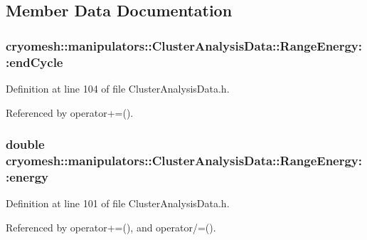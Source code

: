 \subsection{\-Member \-Data \-Documentation}
\hypertarget{structcryomesh_1_1manipulators_1_1ClusterAnalysisData_1_1RangeEnergy_afc1f6d068e8301e327981a578b83f981}{
\subsubsection[{end\-Cycle}]{ {\bf cryomesh\-::manipulators\-::\-Cluster\-Analysis\-Data\-::\-Range\-Energy\-::end\-Cycle}}}\label{structcryomesh_1_1manipulators_1_1ClusterAnalysisData_1_1RangeEnergy_afc1f6d068e8301e327981a578b83f981}


\-Definition at line 104 of file \-Cluster\-Analysis\-Data.\-h.



\-Referenced by operator+=().

\hypertarget{structcryomesh_1_1manipulators_1_1ClusterAnalysisData_1_1RangeEnergy_a5ec0dd8061e8109c679fb03c46175f41}{
\subsubsection[{energy}]{\setlength{\rightskip}{0pt plus 5cm}double {\bf cryomesh\-::manipulators\-::\-Cluster\-Analysis\-Data\-::\-Range\-Energy\-::energy}}}\label{structcryomesh_1_1manipulators_1_1ClusterAnalysisData_1_1RangeEnergy_a5ec0dd8061e8109c679fb03c46175f41}


\-Definition at line 101 of file \-Cluster\-Analysis\-Data.\-h.



\-Referenced by operator+=(), and operator/=().

